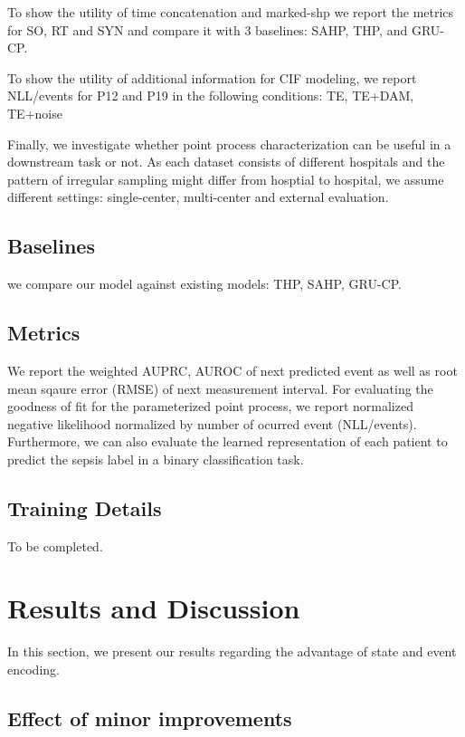 \documentclass[journal,twoside,web]{ieeecolor}
\begin{document}
To show the utility of time concatenation and marked-shp we report the metrics for SO, RT and SYN and compare it with 3 baselines: SAHP, THP, and GRU-CP.

To show the utility of additional information for CIF modeling, we report NLL/events for P12 and P19 in the following conditions: TE, TE+DAM, TE+noise

Finally, we investigate whether point process characterization can be useful in a downstream task or not. As each dataset consists of different hospitals and the pattern of irregular sampling might differ from hosptial to hospital, we assume different settings: single-center, multi-center and external evaluation.



\subsection*{Baselines}

we compare our model against existing models: THP, SAHP, GRU-CP.     

\subsection*{Metrics}
We report the weighted AUPRC, AUROC of next predicted event as well as root mean sqaure error (RMSE) of next measurement interval.
For evaluating the goodness of fit for the parameterized point process, we report normalized negative likelihood normalized by number of ocurred event (NLL/events). Furthermore, we can also evaluate the learned representation of each patient to predict the sepsis label in a binary classification task.

\subsection*{Training Details}
To be completed.
\section{Results and Discussion}
\label{sec:Results and Discussion}


In this section, we present our results regarding the advantage of state and event encoding.

\subsection{Effect of minor improvements}
\end{document}
